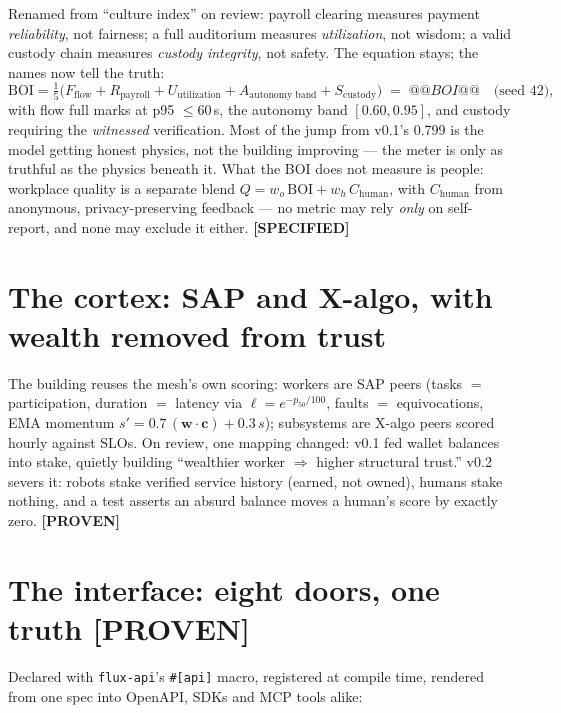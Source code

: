 \documentclass[11pt,a4paper]{article}
\newcommand{\claim}[1]{\textcolor{qsteel}{\textbf{\footnotesize[#1]}}}
\begin{document}
Renamed from ``culture index'' on review: payroll clearing measures payment
\emph{reliability}, not fairness; a full auditorium measures \emph{utilization},
not wisdom; a valid custody chain measures \emph{custody integrity}, not safety.
The equation stays; the names now tell the truth:
\[
\mathrm{BOI} = \tfrac{1}{5}\big(
F_{\text{flow}} + R_{\text{payroll}} + U_{\text{utilization}}
+ A_{\text{autonomy band}} + S_{\text{custody}}\big)
\;=\; @@BOI@@ \quad \text{(seed 42)},
\]
with flow full marks at p95 $\leq 60$\,s, the autonomy band $[0.60, 0.95]$, and
custody requiring the \emph{witnessed} verification. Most of the jump from v0.1's
0.799 is the model getting honest physics, not the building improving --- the
meter is only as truthful as the physics beneath it. What the BOI does not
measure is people: workplace quality is a separate blend
$Q = w_o\,\mathrm{BOI} + w_h\,C_{\text{human}}$, with $C_{\text{human}}$ from
anonymous, privacy-preserving feedback --- no metric may rely \emph{only} on
self-report, and none may exclude it either. \claim{SPECIFIED}

\section{The cortex: SAP and X-algo, with wealth removed from trust}

The building reuses the mesh's own scoring: workers are SAP peers (tasks $=$
participation, duration $=$ latency via $\ell = e^{-p_{50}/100}$, faults $=$
equivocations, EMA momentum $s' = 0.7\,(\mathbf{w}\cdot\mathbf{c}) + 0.3\,s$);
subsystems are X-algo peers scored hourly against SLOs. On review, one mapping
changed: v0.1 fed wallet balances into stake, quietly building ``wealthier worker
$\Rightarrow$ higher structural trust.'' v0.2 severs it: robots stake verified
service history (earned, not owned), humans stake nothing, and a test asserts an
absurd balance moves a human's score by exactly zero. \claim{PROVEN}

\section{The interface: eight doors, one truth \hfill \claim{PROVEN}}

Declared with \texttt{flux-api}'s \texttt{\#[api]} macro, registered at compile
time, rendered from one spec into OpenAPI, SDKs and MCP tools alike:
\end{document}
